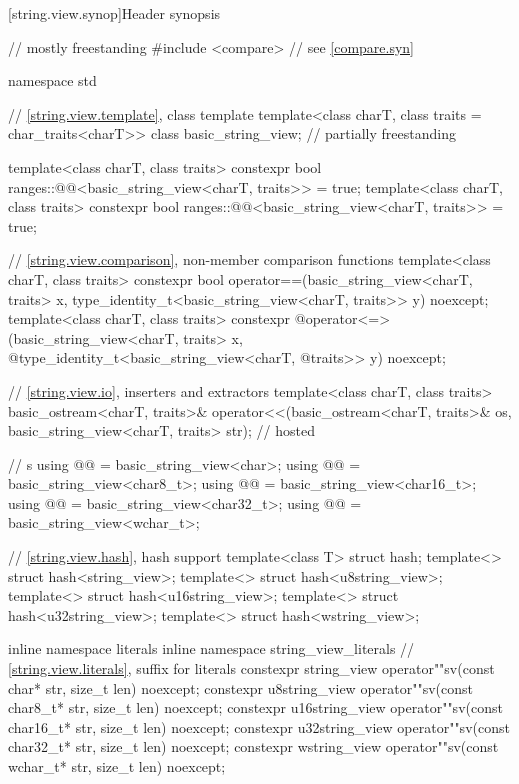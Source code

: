 [string.view.synop]{Header  synopsis}

%
\begin{codeblock}
// mostly freestanding
#include <compare>              // see \ref{compare.syn}

namespace std {
  // \ref{string.view.template}, class template 
  template<class charT, class traits = char_traits<charT>>
  class basic_string_view;                                              // partially freestanding

  template<class charT, class traits>
    constexpr bool ranges::@@<basic_string_view<charT, traits>> = true;
  template<class charT, class traits>
    constexpr bool ranges::@@<basic_string_view<charT, traits>> = true;

  // \ref{string.view.comparison}, non-member comparison functions
  template<class charT, class traits>
    constexpr bool operator==(basic_string_view<charT, traits> x,
                              type_identity_t<basic_string_view<charT, traits>> y) noexcept;
  template<class charT, class traits>
    constexpr @\seebelow@ operator<=>(basic_string_view<charT, traits> x,
              @\itcorr@                      type_identity_t<basic_string_view<charT,
              @\itcorr@                                      traits>> y) noexcept;

  // \ref{string.view.io}, inserters and extractors
  template<class charT, class traits>
    basic_ostream<charT, traits>&
      operator<<(basic_ostream<charT, traits>& os,
                 basic_string_view<charT, traits> str);                 // hosted

  //  s
  using @@    = basic_string_view<char>;
  using @@  = basic_string_view<char8_t>;
  using @@ = basic_string_view<char16_t>;
  using @@ = basic_string_view<char32_t>;
  using @@   = basic_string_view<wchar_t>;

  // \ref{string.view.hash}, hash support
  template<class T> struct hash;
  template<> struct hash<string_view>;
  template<> struct hash<u8string_view>;
  template<> struct hash<u16string_view>;
  template<> struct hash<u32string_view>;
  template<> struct hash<wstring_view>;

  inline namespace literals {
    inline namespace string_view_literals {
      // \ref{string.view.literals}, suffix for  literals
      constexpr string_view    operator""sv(const char* str, size_t len) noexcept;
      constexpr u8string_view  operator""sv(const char8_t* str, size_t len) noexcept;
      constexpr u16string_view operator""sv(const char16_t* str, size_t len) noexcept;
      constexpr u32string_view operator""sv(const char32_t* str, size_t len) noexcept;
      constexpr wstring_view   operator""sv(const wchar_t* str, size_t len) noexcept;
    }
  }
}
\end{codeblock}

